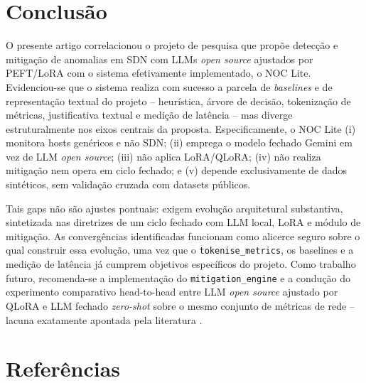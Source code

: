 \documentclass[12pt,a4paper]{article}
\begin{document}
\section{Conclusão}
\label{sec:conclusao}

O presente artigo correlacionou o projeto de pesquisa que propõe detecção e
mitigação de anomalias em SDN com LLMs \textit{open source} ajustados por
PEFT/LoRA  com o sistema efetivamente implementado, o NOC Lite.
Evidenciou-se que o sistema realiza com sucesso a parcela de \textit{
baselines} e de representação textual do projeto -- heurística, árvore de
decisão, tokenização de métricas, justificativa textual e medição de latência
-- mas diverge estruturalmente nos eixos centrais da proposta. Especificamente,
o NOC Lite (i) monitora hosts genéricos e não SDN; (ii) emprega o modelo
fechado Gemini em vez de LLM \textit{open source}; (iii) não aplica LoRA/QLoRA;
(iv) não realiza mitigação nem opera em ciclo fechado; e (v) depende
exclusivamente de dados sintéticos, sem validação cruzada com datasets
públicos.

Tais gaps não são ajustes pontuais: exigem evolução arquitetural substantiva,
sintetizada nas diretrizes de um ciclo fechado com LLM local, LoRA e módulo de
mitigação. As convergências identificadas funcionam como alicerce seguro sobre
o qual construir essa evolução, uma vez que o \texttt{tokenise\_metrics}, os
baselines e a medição de latência já cumprem objetivos específicos do projeto.
Como trabalho futuro, recomenda-se a implementação do \texttt{mitigation\_engine}
e a condução do experimento comparativo head-to-head entre LLM \textit{open
source} ajustado por QLoRA e LLM fechado \textit{zero-shot} sobre o mesmo
conjunto de métricas de rede -- lacuna exatamente apontada pela literatura
\cite{rA49}\cite{rA630}.

\section*{Referências}

\end{document}
